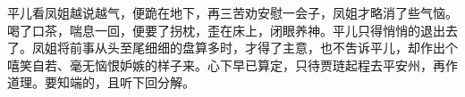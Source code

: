 \begin{parag}
    平儿看凤姐越说越气，便跪在地下，再三苦劝安慰一会子，凤姐才略消了些气恼。喝了口茶，喘息一回，便要了拐枕，歪在床上，闭眼养神。平儿只得悄悄的退出去了。凤姐将前事从头至尾细细的盘算多时，才得了主意，也不吿诉平儿，却作出个嘻笑自若、毫无恼恨妒嫉的样子来。心下早已算定，只待贾琏起程去平安州，再作道理。要知端的，且听下回分解。
\end{parag}

